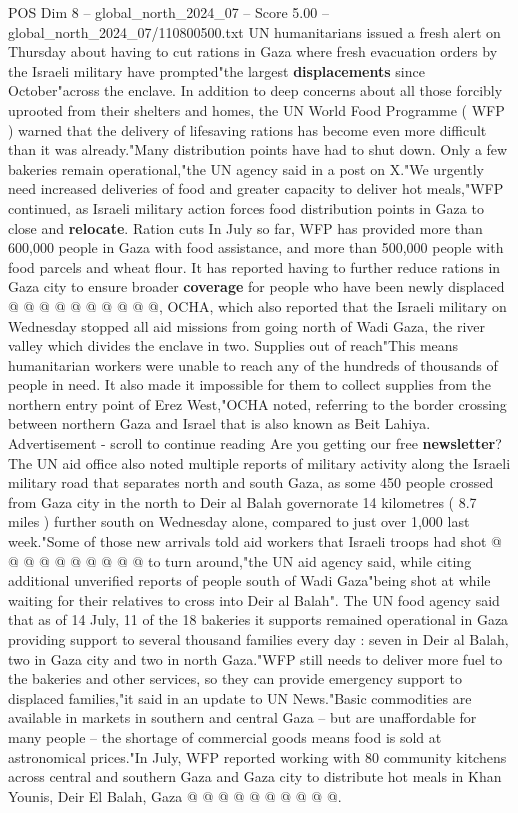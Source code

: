 \begin{textsample}{POS Dim 8 – global\_north\_2024\_07 – Score 5.00 – global\_north\_2024\_07/110800500.txt}  \label{ex:f8_pos_262}
UN humanitarians issued a fresh alert on Thursday about having to cut rations in Gaza where fresh evacuation orders by the Israeli military have prompted"the largest \textbf{displacements} since October"across the enclave.
In addition to deep concerns about all those forcibly uprooted from their shelters and homes, the UN World Food Programme ( WFP ) warned that the delivery of lifesaving rations has become even more difficult than it was already."Many distribution points have had to shut down.
Only a few bakeries remain operational,"the UN agency said in a post on X."We urgently need increased deliveries of food and greater capacity to deliver hot meals,"WFP continued, as Israeli military action forces food distribution points in Gaza to close and \textbf{relocate}.
Ration cuts In July so far, WFP has provided more than 600,000 people in Gaza with food assistance, and more than 500,000 people with food parcels and wheat flour.
It has reported having to further reduce rations in Gaza city to ensure broader \textbf{coverage} for people who have been newly displaced @ @ @ @ @ @ @ @ @ @, OCHA, which also reported that the Israeli military on Wednesday stopped all aid missions from going north of Wadi Gaza, the river valley which divides the enclave in two.
Supplies out of reach"This means humanitarian workers were unable to reach any of the hundreds of thousands of people in need.
It also made it impossible for them to collect supplies from the northern entry point of Erez West,"OCHA noted, referring to the border crossing between northern Gaza and Israel that is also known as Beit Lahiya.
Advertisement - scroll to continue reading Are you getting our free \textbf{newsletter}?
The UN aid office also noted multiple reports of military activity along the Israeli military road that separates north and south Gaza, as some 450 people crossed from Gaza city in the north to Deir al Balah governorate 14 kilometres ( 8.7 miles ) further south on Wednesday alone, compared to just over 1,000 last week."Some of those new arrivals told aid workers that Israeli troops had shot @ @ @ @ @ @ @ @ @ @ to turn around,"the UN aid agency said, while citing additional unverified reports of people south of Wadi Gaza"being shot at while waiting for their relatives to cross into Deir al Balah".
The UN food agency said that as of 14 July, 11 of the 18 bakeries it supports remained operational in Gaza providing support to several thousand families every day : seven in Deir al Balah, two in Gaza city and two in north Gaza."WFP still needs to deliver more fuel to the bakeries and other services, so they can provide emergency support to displaced families,"it said in an update to UN News."Basic commodities are available in markets in southern and central Gaza -- but are unaffordable for many people -- the shortage of commercial goods means food is sold at astronomical prices."In July, WFP reported working with 80 community kitchens across central and southern Gaza and Gaza city to distribute hot meals in Khan Younis, Deir El Balah, Gaza @ @ @ @ @ @ @ @ @ @.

\end{textsample}

